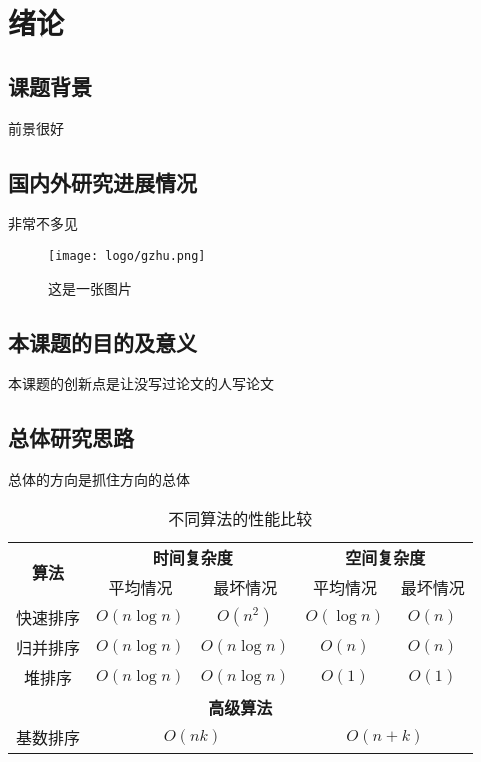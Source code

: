 \documentclass[12pt,a4paper,AutoFakeBold]{article}
\newcommand{\song}{\CJKfamily{song}}
\newcommand{\mkls}{\linespread{1.7}\selectfont}
\begin{document}
\renewcommand{\contentsname}{\centerline{\zihao{-2}\textbf{目录}}}
\linespread{1.2}\selectfont{
	\tableofcontents
}

\newpage

{
\mkls%
\song%

\setcounter{section}{0} %
\section{绪论}


\subsection{课题背景}

前景很好
\cite{beckSurveyMetaReinforcementLearning2023}
\subsection{国内外研究进展情况}
非常不多见

\begin{figure}
	\centering
	\texttt{[image: logo/gzhu.png]}
	\caption{这是一张图片}
	\label{fig:1}
\end{figure}

\subsection{本课题的目的及意义}
本课题的创新点是让没写过论文的人写论文

\subsection{总体研究思路}

总体的方向是抓住方向的总体

\begin{table}[htbp]
	\centering
	\caption{不同算法的性能比较}
	\begin{tabular}{|c|c|c|c|c|}
	  \hline
	  \multirow{2}{*}{\textbf{算法}} & \multicolumn{2}{c|}{\textbf{时间复杂度}} & \multicolumn{2}{c|}{\textbf{空间复杂度}} \\
	  \cline{2-5}
	  & 平均情况 & 最坏情况 & 平均情况 & 最坏情况 \\
	  \hline
	  快速排序 & $O(n\log n)$ & $O(n^2)$ & $O(\log n)$ & $O(n)$ \\
	  \hline
	  归并排序 & $O(n\log n)$ & $O(n\log n)$ & $O(n)$ & $O(n)$ \\
	  \hline
	  堆排序 & $O(n\log n)$ & $O(n\log n)$ & $O(1)$ & $O(1)$ \\
	  \hline
	  \multicolumn{5}{|c|}{\textbf{高级算法}} \\
	  \hline
	  基数排序 & \multicolumn{2}{c|}{$O(nk)$} & \multicolumn{2}{c|}{$O(n+k)$} \\
	  \hline
	\end{tabular}
	\label{tab:algorithm_comparison}
\end{table}


}
\end{document}
